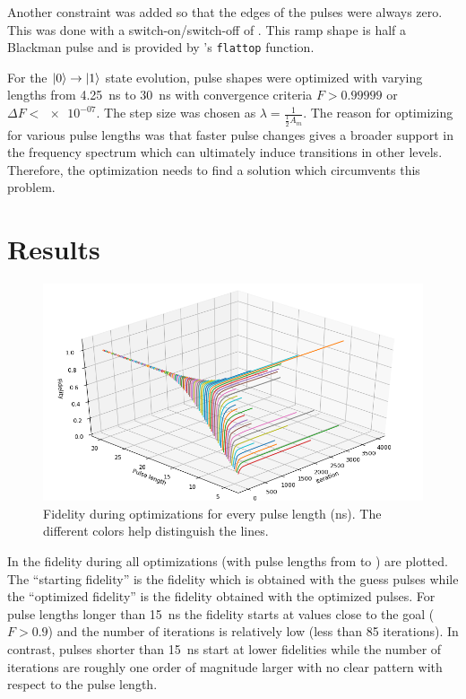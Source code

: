 \documentclass[main.tex]{subfiles}
\begin{document}
Another constraint was added so that the edges of the pulses were always zero.
This was done with a switch-on/switch-off of .
This ramp shape is half a Blackman pulse and is provided by \krotov{}'s \texttt{flattop} function.

For the \(\ket{0}\rightarrow\ket{1}\) state evolution, pulse shapes were optimized with varying lengths from \SI{4.25}{\nano\second} to \SI{30}{\nano\second} with convergence criteria \(F>0.99999\) or \(\Delta F < \num{e-07}\).
The step size was chosen as \(\lambda = \frac{1}{\frac{1}{2}A_{m}}\).
The reason for optimizing for various pulse lengths was that faster pulse changes gives a broader support in the frequency spectrum which can ultimately induce transitions in other levels.
Therefore, the optimization needs to find a solution which circumvents this problem.

\section{Results}
\begin{figure}[H]
    \centering
    \includegraphics[width=\linewidth]{figs/3d-optim-ge.png}
    \caption{Fidelity during optimizations for every pulse length (ns). The different colors help distinguish the lines.}\label{fig:3d-optim-ge}
\end{figure}

In  the fidelity during all optimizations (with pulse lengths from  to ) are plotted.
The ``starting fidelity'' is the fidelity which is obtained with the guess pulses while the ``optimized fidelity'' is the fidelity obtained with the optimized pulses.
For pulse lengths longer than \SI{15}{\nano\second} the fidelity starts at values close to the goal (\(F>0.9\)) and the number of iterations is relatively low (less than 85 iterations).
In contrast, pulses shorter than \SI{15}{\nano\second} start at lower fidelities while the number of iterations are roughly one order of magnitude larger with no clear pattern with respect to the pulse length.
\end{document}
